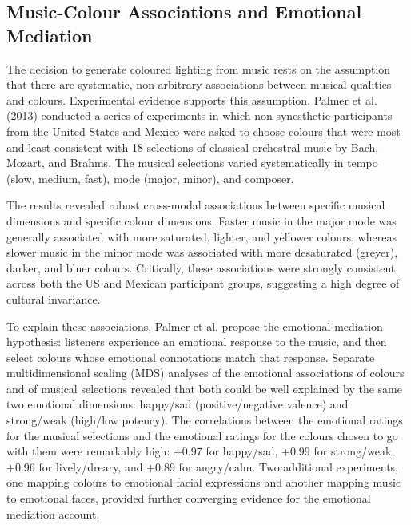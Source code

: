 \subsection{Music-Colour Associations and Emotional Mediation}

The decision to generate coloured lighting from music rests on the assumption that there are systematic, non-arbitrary associations between musical qualities and colours. Experimental evidence supports this assumption. Palmer et al. (2013) conducted a series of experiments in which non-synesthetic participants from the United States and Mexico were asked to choose colours that were most and least consistent with 18 selections of classical orchestral music by Bach, Mozart, and Brahms.\cite{stephenepalmer201313}  The musical selections varied systematically in tempo (slow, medium, fast), mode (major, minor), and composer.

The results revealed robust cross-modal associations between specific musical dimensions and specific colour dimensions. Faster music in the major mode was generally associated with more saturated, lighter, and yellower colours, whereas slower music in the minor mode was associated with more desaturated (greyer), darker, and bluer colours. Critically, these associations were strongly consistent across both the US and Mexican participant groups, suggesting a high degree of cultural invariance.\cite{stephenepalmer201313} 

To explain these associations, Palmer et al. propose the emotional mediation hypothesis: listeners experience an emotional response to the music, and then select colours whose emotional connotations match that response.\cite{stephenepalmer201313}  Separate multidimensional scaling (MDS) analyses of the emotional associations of colours and of musical selections revealed that both could be well explained by the same two emotional dimensions: happy/sad (positive/negative valence) and strong/weak (high/low potency). The correlations between the emotional ratings for the musical selections and the emotional ratings for the colours chosen to go with them were remarkably high: +0.97 for happy/sad, +0.99 for strong/weak, +0.96 for lively/dreary, and +0.89 for angry/calm.\cite{stephenepalmer201313}  Two additional experiments, one mapping colours to emotional facial expressions and another mapping music to emotional faces, provided further converging evidence for the emotional mediation account.\cite{stephenepalmer201313} 

